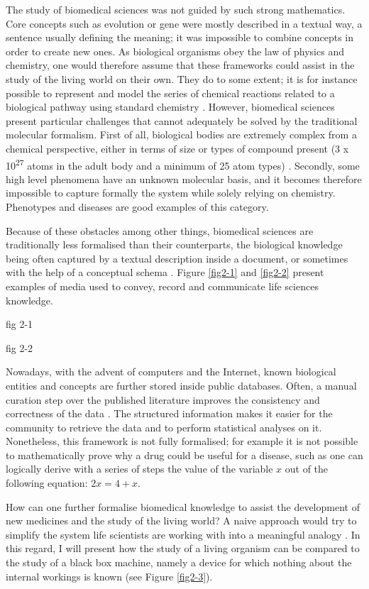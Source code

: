 The study of biomedical sciences was not guided by such strong mathematics. Core concepts such as evolution or gene were mostly described in a textual way, a sentence usually defining the meaning; it was impossible to combine concepts in order to create new ones. As biological organisms obey the law of physics and chemistry, one would therefore assume that these frameworks could assist in the study of the living world on their own. They do to some extent; it is for instance possible to represent and model the series of chemical reactions related to a biological pathway using standard chemistry \citep{le2006biomodels}. However, biomedical sciences present particular challenges that cannot adequately be solved by the traditional molecular formalism. First of all, biological bodies are extremely complex from a chemical perspective, either in terms of size or types of compound present (3 x 10\textsuperscript{27} atoms in the adult body and a minimum of 25 atom types) \citep{nielsen1999ultratrace}. Secondly, some high level phenomena have an unknown molecular basis, and it becomes therefore impossible to capture formally the system while solely relying on chemistry. Phenotypes and diseases are good examples of this category.

Because of these obstacles among other things, biomedical sciences are traditionally less formalised than their counterparts, the biological knowledge being often captured by a textual description inside a document, or sometimes with the help of a conceptual schema \citep{lazebnik2002can}. Figure \ref{fig2-1} and \ref{fig2-2} present examples of media used to convey, record and communicate life sciences knowledge.

fig 2-1

fig 2-2

Nowadays, with the advent of computers and the Internet, known biological entities and concepts are further stored inside public databases. Often, a manual curation step over the published literature improves the consistency and correctness of the data \citep{brooksbank2014european}. The structured information makes it easier for the community to retrieve the data and to perform statistical analyses on it. Nonetheless, this framework is not fully formalised; for example it is not possible to mathematically prove why a drug could be useful for a disease, such as one can logically derive with a series of steps the value of the variable $ x $ out of the following equation: $ 2x = 4 + x $.

How can one further formalise biomedical knowledge to assist the development of new medicines and the study of the living world? A naive approach would try to simplify the system life scientists are working with into a meaningful analogy \citep{lazebnik2002can}. In this regard, I will present how the study of a living organism can be compared to the study of a black box machine, namely a device for which nothing about the internal workings is known (see Figure \ref{fig2-3}).

